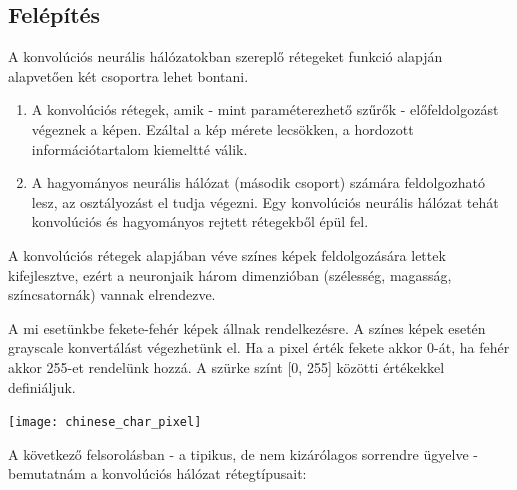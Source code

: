 \subsection{Felépítés}

A konvolúciós neurális hálózatokban szereplő rétegeket funkció alapján alapvetően két csoportra lehet bontani.

\begin{enumerate}
\item A konvolúciós rétegek, amik - mint paraméterezhető szűrők - előfeldolgozást végeznek a képen. Ezáltal a kép mérete lecsökken, a hordozott információtartalom kiemeltté válik.
\item A hagyományos neurális hálózat (második csoport) számára feldolgozható lesz, az osztályozást el tudja végezni. Egy konvolúciós neurális hálózat tehát konvolúciós és hagyományos rejtett rétegekből épül fel.
\end{enumerate}

A konvolúciós rétegek alapjában véve színes képek feldolgozására lettek kifejlesztve, ezért a neuronjaik három dimenzióban (szélesség, magasság, színcsatornák) vannak elrendezve.

A mi esetünkbe fekete-fehér képek állnak rendelkezésre. A színes képek esetén grayscale konvertálást végezhetünk el. Ha a pixel érték fekete akkor 0-át, ha fehér akkor 255-et rendelünk hozzá. A szürke színt [0, 255] közötti értékekkel definiáljuk.

\begin{center}
\texttt{[image: chinese\_char\_pixel]}
\end{center}

A következő felsorolásban - a tipikus, de nem kizárólagos sorrendre ügyelve - bemutatnám a konvolúciós hálózat rétegtípusait:

